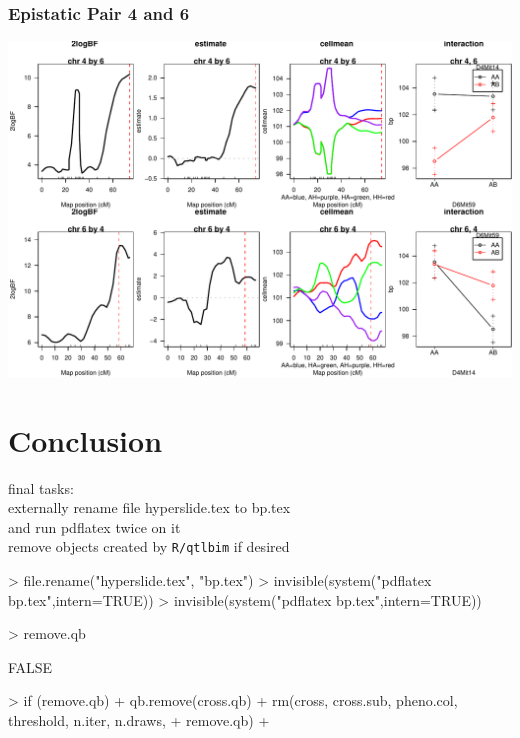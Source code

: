 \documentclass{beamer}
\begin{document}
\begin{frame}[fragile]
\frametitle{Epistatic Pair 4 and 6 }

\includegraphics{bpPDF/slide-4-6.pdf}


\end{frame}

\section{Conclusion}

\begin{frame}[fragile]

final tasks:\\
externally rename file hyperslide.tex to bp.tex\\
and run pdflatex twice on it\\
remove objects created by {\tt R/qtlbim} if desired

\tiny

\begin{Schunk}
\begin{Sinput}
> file.rename("hyperslide.tex", "bp.tex")
> invisible(system("pdflatex bp.tex",intern=TRUE))
> invisible(system("pdflatex bp.tex",intern=TRUE))
\end{Sinput}
\end{Schunk}
\begin{Schunk}
\begin{Sinput}
> remove.qb
\end{Sinput}
\begin{Soutput}
[1] FALSE
\end{Soutput}
\begin{Sinput}
> if (remove.qb) {
+     qb.remove(cross.qb)
+     rm(cross, cross.sub, pheno.col, threshold, n.iter, n.draws, 
+         remove.qb)
+ }
\end{Sinput}
\end{Schunk}


\end{frame}
\end{document}
